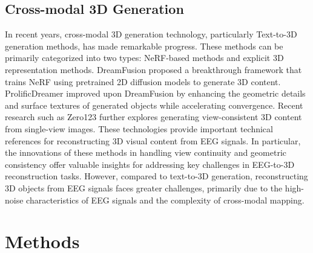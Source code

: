 \documentclass[conference]{IEEEtran}
\begin{document}
\subsection{Cross-modal 3D Generation}
In recent years, cross-modal 3D generation technology, particularly Text-to-3D generation methods, has made remarkable progress. These methods can be primarily categorized into two types: NeRF-based methods and explicit 3D representation methods. DreamFusion \cite{b12} proposed a breakthrough framework that trains NeRF using pretrained 2D diffusion models to generate 3D content. ProlificDreamer \cite{b11} improved upon DreamFusion by enhancing the geometric details and surface textures of generated objects while accelerating convergence. Recent research such as Zero123 \cite{b40} further explores generating view-consistent 3D content from single-view images. These technologies provide important technical references for reconstructing 3D visual content from EEG signals. In particular, the innovations of these methods in handling view continuity and geometric consistency offer valuable insights for addressing key challenges in EEG-to-3D reconstruction tasks. However, compared to text-to-3D generation, reconstructing 3D objects from EEG signals faces greater challenges, primarily due to the high-noise characteristics of EEG signals and the complexity of cross-modal mapping.

\section{Methods}
\end{document}
